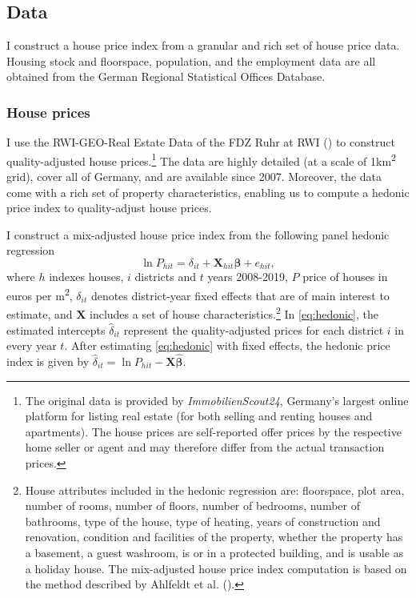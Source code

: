 \documentclass[
  12pt,
]{article}
\begin{document}
\subsection{Data}\label{data}

I construct a house price index from a granular and rich set of house price data. Housing stock and floorspace, population, and the employment data are all obtained from the German Regional Statistical Offices Database.

\subsubsection{House prices}\label{hedonic}

I use the RWI-GEO-Real Estate Data of the FDZ Ruhr at RWI () to construct quality-adjusted house prices.\footnote{The original data is provided by \emph{ImmobilienScout24}, Germany's largest online platform for listing real estate (for both selling and renting houses and apartments). The house prices are self-reported offer prices by the respective home seller or agent and may therefore differ from the actual transaction prices.} The data are highly detailed (at a scale of 1km\textsuperscript{2} grid), cover all of Germany, and are available since 2007. Moreover, the data come with a rich set of property characteristics, enabling us to compute a hedonic price index to quality-adjust house prices.

I construct a mix-adjusted house price index from the following panel hedonic regression \begin{equation}
  \ln P_{hit} = \delta_{it} + \mathbf{X}_{hit}\boldsymbol{\beta} + e_{hit},
  \label{eq:hedonic}
\end{equation} where \(h\) indexes houses, \(i\) districts and \(t\) years 2008-2019, \(P\) price of houses in euros per m\textsuperscript{2}, \(\delta_{it}\) denotes district-year fixed effects that are of main interest to estimate, and \(\mathbf{X}\) includes a set of house characteristics.\footnote{House attributes included in the hedonic regression are: floorspace, plot area, number of rooms, number of floors, number of bedrooms, number of bathrooms, type of the house, type of heating, years of construction and renovation, condition and facilities of the property, whether the property has a basement, a guest washroom, is or in a protected building, and is usable as a holiday house. The mix-adjusted house price index computation is based on the method described by Ahlfeldt et al. ().} In \eqref{eq:hedonic}, the estimated intercepts \(\widehat{\delta}_{it}\) represent the quality-adjusted prices for each district \(i\) in every year \(t\). After estimating \eqref{eq:hedonic} with fixed effects, the hedonic price index is given by \(\widehat{\delta}_{it} = \ln P_{hit} - \mathbf{X}\boldsymbol{\widehat{\beta}}\).
\end{document}
